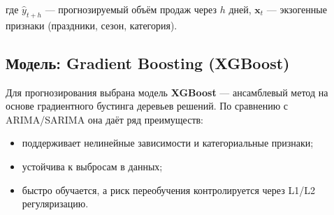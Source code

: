 \documentclass[14pt,a4paper]{extreport}
\begin{document}
где $\hat{y}_{t+h}$ --- прогнозируемый объём продаж через $h$ дней, $\mathbf{x}_t$ --- экзогенные признаки (праздники, сезон, категория).

\subsection{Модель: Gradient Boosting (XGBoost)}

Для прогнозирования выбрана модель \textbf{XGBoost} \cite{chen2016} --- ансамблевый метод на основе градиентного бустинга деревьев решений. По сравнению с ARIMA/SARIMA она даёт ряд преимуществ:
\begin{itemize}
  \item поддерживает нелинейные зависимости и категориальные признаки;
  \item устойчива к выбросам в данных;
  \item быстро обучается, а риск переобучения контролируется через L1/L2 регуляризацию.
\end{itemize}

\begin{table}[h!]
\centering
\caption{Признаки модели прогнозирования спроса}
\end{table}
\end{document}
